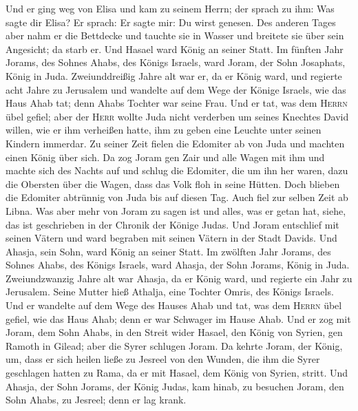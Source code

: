  Und er ging weg von Elisa und kam zu seinem Herrn; der
sprach zu ihm: Was sagte dir Elisa? Er sprach: Er sagte mir: Du wirst
genesen.  Des anderen Tages aber nahm er die Bettdecke
und tauchte sie in Wasser und breitete sie über sein Angesicht; da starb
er. Und Hasael ward König an seiner Statt.  Im fünften
Jahr Jorams, des Sohnes Ahabs, des Königs Israels, ward Joram, der Sohn
Josaphats, König in Juda.  Zweiunddreißig Jahre alt war
er, da er König ward, und regierte acht Jahre zu Jerusalem
 und wandelte auf dem Wege der Könige Israels, wie das
Haus Ahab tat; denn Ahabs Tochter war seine Frau. Und er tat, was dem
\textsc{Herrn} übel gefiel;  aber der \textsc{Herr}
wollte Juda nicht verderben um seines Knechtes David willen, wie er ihm
verheißen hatte, ihm zu geben eine Leuchte unter seinen Kindern
immerdar.  Zu seiner Zeit fielen die Edomiter ab von Juda
und machten einen König über sich.  Da zog Joram gen Zair
und alle Wagen mit ihm und machte sich des Nachts auf und schlug die
Edomiter, die um ihn her waren, dazu die Obersten über die Wagen, dass
das Volk floh in seine Hütten.  Doch blieben die Edomiter
abtrünnig von Juda bis auf diesen Tag. Auch fiel zur selben Zeit ab
Libna.  Was aber mehr von Joram zu sagen ist und alles,
was er getan hat, siehe, das ist geschrieben in der Chronik der Könige
Judas.  Und Joram entschlief mit seinen Vätern und ward
begraben mit seinen Vätern in der Stadt Davids. Und Ahasja, sein Sohn,
ward König an seiner Statt.  Im zwölften Jahr Jorams, des
Sohnes Ahabs, des Königs Israels, ward Ahasja, der Sohn Jorams, König in
Juda.  Zweiundzwanzig Jahre alt war Ahasja, da er König
ward, und regierte ein Jahr zu Jerusalem. Seine Mutter hieß Athalja,
eine Tochter Omris, des Königs Israels.  Und er wandelte
auf dem Wege des Hauses Ahab und tat, was dem \textsc{Herrn} übel
gefiel, wie das Haus Ahab; denn er war Schwager im Hause Ahab.
 Und er zog mit Joram, dem Sohn Ahabs, in den Streit
wider Hasael, den König von Syrien, gen Ramoth in Gilead; aber die Syrer
schlugen Joram.  Da kehrte Joram, der König, um, dass er
sich heilen ließe zu Jesreel von den Wunden, die ihm die Syrer
geschlagen hatten zu Rama, da er mit Hasael, dem König von Syrien,
stritt. Und Ahasja, der Sohn Jorams, der König Judas, kam hinab, zu
besuchen Joram, den Sohn Ahabs, zu Jesreel; denn er lag krank.

